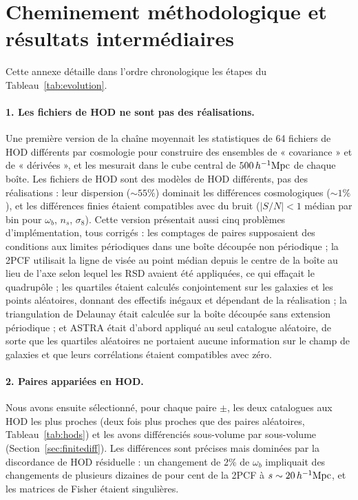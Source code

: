 \section{Cheminement méthodologique et résultats intermédiaires}
\label{app:path}

Cette annexe détaille dans l'ordre chronologique les étapes du Tableau~\ref{tab:evolution}.

\paragraph{1. Les fichiers de HOD ne sont pas des réalisations.} Une première version de la chaîne moyennait les statistiques de 64 fichiers de HOD différents par cosmologie pour construire des ensembles de « covariance » et de « dérivées », et les mesurait dans le cube central de $500\,h^{-1}\mathrm{Mpc}$ de chaque boîte. Les fichiers de HOD sont des modèles de HOD différents, pas des réalisations : leur dispersion ($\sim55\%$) dominait les différences cosmologiques ($\sim1\%$), et les différences finies étaient compatibles avec du bruit ($|S/N|<1$ médian par bin pour $\omega_b$, $n_s$, $\sigma_8$). Cette version présentait aussi cinq problèmes d'implémentation, tous corrigés : les comptages de paires supposaient des conditions aux limites périodiques dans une boîte découpée non périodique ; la 2PCF utilisait la ligne de visée au point médian depuis le centre de la boîte au lieu de l'axe selon lequel les RSD avaient été appliquées, ce qui effaçait le quadrupôle ; les quartiles étaient calculés conjointement sur les galaxies et les points aléatoires, donnant des effectifs inégaux et dépendant de la réalisation ; la triangulation de Delaunay était calculée sur la boîte découpée sans extension périodique ; et ASTRA était d'abord appliqué au seul catalogue aléatoire, de sorte que les quartiles aléatoires ne portaient aucune information sur le champ de galaxies et que leurs corrélations étaient compatibles avec zéro.

\paragraph{2. Paires appariées en HOD.} Nous avons ensuite sélectionné, pour chaque paire $\pm$, les deux catalogues aux HOD les plus proches (deux fois plus proches que des paires aléatoires, Tableau~\ref{tab:hods}) et les avons différenciés sous-volume par sous-volume (Section~\ref{sec:finitediff}). Les différences sont précises mais dominées par la discordance de HOD résiduelle : un changement de 2\% de $\omega_b$ impliquait des changements de plusieurs dizaines de pour cent de la 2PCF à $s\sim20\,h^{-1}\mathrm{Mpc}$, et les matrices de Fisher étaient singulières.

